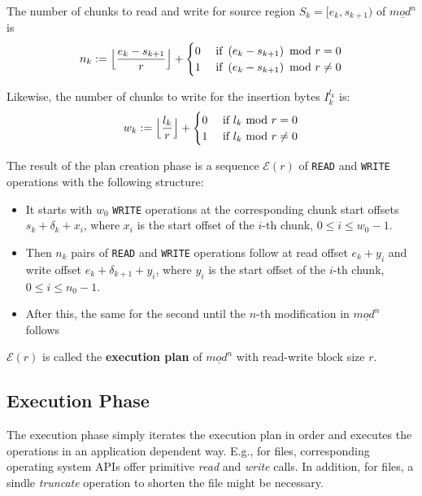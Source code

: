 \documentclass[english, 10pt, openright, twocolumn, landscape, twoside, notitlepage, a4paper, pdftex]		
{article}
\begin{document}
The number of chunks to read and write for source region $S_{k}=[e_{k},s_{k+1})$ of $\underline{mod^{n}}$ is 
\[n_{k}:=\Bigl\lfloor\frac{e_{k}-s_{k+1}}{r}\Bigr\rfloor+
\begin{cases}
0 & \text{ if }\left(e_{k}-s_{k+1}\right)\text{ mod } r = 0\\
1 & \text{ if }\left(e_{k}-s_{k+1}\right)\text{ mod } r \neq 0\\
\end{cases}
\]

Likewise, the number of chunks to write for the insertion bytes $I_{k}^{l_{k}}$ is:
\[w_{k}:=\Bigl\lfloor\frac{l_{k}}{r}\Bigr\rfloor+
\begin{cases}
0 & \text{ if }l_{k}\text{ mod } r = 0\\
1 & \text{ if }l_{k}\text{ mod } r \neq 0\\
\end{cases}
\]

The result of the plan creation phase is a sequence $\mathcal{E}(r)$ of \texttt{READ} and \texttt{WRITE} operations with the following structure:
\begin{itemize}
\item It starts with $w_{0}$ \texttt{WRITE} operations at the corresponding chunk start offsets $s_{k}+\delta_{k}+x_{i}$, where $x_{i}$ is the start offset of the $i$-th chunk, $0\leq i\leq w_{0}-1$.
\item Then $n_{k}$ pairs of \texttt{READ} and \texttt{WRITE} operations follow at read offset $e_{k}+y_{i}$ and write offset $e_{k}+\delta_{k+1}+y_{i}$, where $y_{i}$ is the start offset of the $i$-th chunk, $0\leq i\leq n_{0}-1$.
\item After this, the same for the second until the $n$-th modification in $\underline{mod^{n}}$ follows
\end{itemize}

$\mathcal{E}(r)$ is called the \textbf{execution plan} of $\underline{mod^{n}}$ with read-write block size $r$.

\subsection{Execution Phase}%
\label{sec:ExecutionPhase}%

The execution phase simply iterates the execution plan in order and executes the operations in an application dependent way. E.g., for files, corresponding operating system APIs offer primitive \emph{read} and \emph{write} calls. In addition, for files, a sindle \emph{truncate} operation to shorten the file might be necessary.
\end{document}
